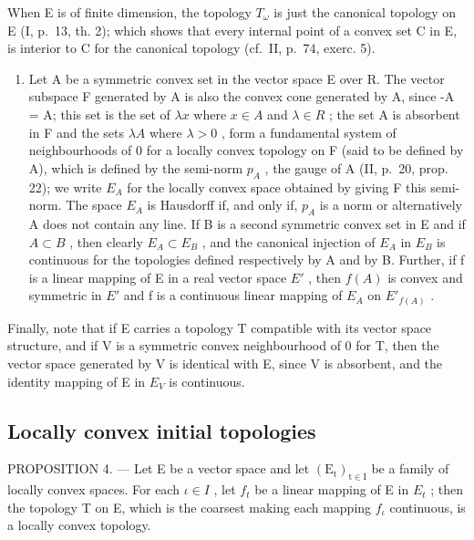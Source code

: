 When E is of finite dimension, the topology \(T_{\omega}\) is just the canonical topology on E (I, p.~13, th. 2); which shows that every internal point of a convex set C in E, is interior to C for the canonical topology (cf.~II, p.~74, exerc. 5).

\begin{enumerate}
\def\labelenumi{\arabic{enumi})}
\setcounter{enumi}{2}
\tightlist
\item
  Let A be a symmetric convex set in the vector space E over R. The vector subspace F generated by A is also the convex cone generated by A, since -A = A; this set is the set of \(\lambda x\) where \(x \in A\) and \(\lambda \in R\) ; the set A is absorbent in F and the sets \(\lambda A\) where \(\lambda > 0\) , form a fundamental system of neighbourhoods of 0 for a locally convex topology on F (said to be defined by A), which is defined by the semi-norm \(p_{A}\) , the gauge of A (II, p.~20, prop. 22); we write \(E_{A}\) for the locally convex space obtained by giving F this semi-norm. The space \(E_{A}\) is Hausdorff if, and only if, \(p_{A}\) is a norm or alternatively A does not contain any line. If B is a second symmetric convex set in E and if \(A \subset B\) , then clearly \(E_{A} \subset E_{B}\) , and the canonical injection of \(E_{A}\) in \(E_{B}\) is continuous for the topologies defined respectively by A and by B. Further, if f is a linear mapping of E in a real vector space \(E'\) , then \(f(A)\) is convex and symmetric in \(E'\) and f is a continuous linear mapping of \(E_{A}\) on \(E'_{f(A)}\) .
\end{enumerate}

Finally, note that if E carries a topology T compatible with its vector space structure, and if V is a symmetric convex neighbourhood of 0 for T, then the vector space generated by V is identical with E, since V is absorbent, and the identity mapping of E in \(E_{V}\) is continuous.

\subsection{Locally convex initial topologies}

PROPOSITION 4. --- Let E be a vector space and let \((\mathrm{E}_{\mathrm{t}})_{\mathrm{t}\in\mathrm{I}}\) be a family of locally convex spaces. For each \(\iota\in I\) , let \(f_{t}\) be a linear mapping of E in \(E_{t}\) ; then the topology T on E, which is the coarsest making each mapping \(f_{\iota}\) continuous, is a locally convex topology.

